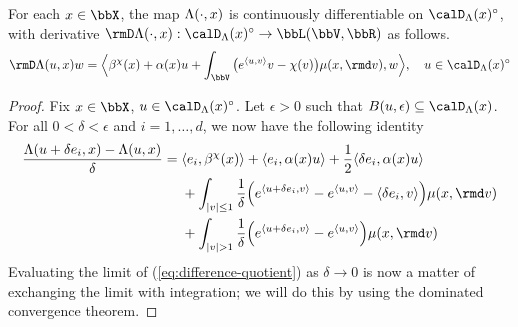 \begin{lemma}
  \label{lemma:ode-differentiable}
  For each $\stateVar \in \stateSpace$, the map $\Lambda(\cdot,x)$ is continuously differentiable on $\odeSpace(\stateVar)^\circ$, with derivative $\Der \ode(\cdot,\stateVar): \odeSpace(\stateVar)^\circ \rightarrow \bbL(\vecSpace, \bbR)$ as follows.
  \begin{equation}
    \label{eq:ode-derivative-truncation}
    \Der \ode(\momentVar,\stateVar) w = \Bprj{\affDrift^\trunc(\stateVar) + \affDiff(\stateVar)\momentVar + \int_\vecSpace \big( e^\prj{\momentVar}{\markVar} \markVar - \trunc(\markVar)\big) \affJump(\stateVar,\rmd\markVar)}{w}, \quad \momentVar \in \odeSpace(\stateVar)^\circ
  \end{equation}
\end{lemma}
\begin{proof}
  \label{proof:lemma:ode-differentiable}
  Fix $\stateVar \in \stateSpace$, $\momentVar \in \odeSpace(\stateVar)^\circ$.
  Let $\epsilon > 0$ such that $B(\momentVar, \epsilon) \subseteq \odeSpace(\stateVar)$.
  For all $0 < \delta < \epsilon$ and $i = 1, \ldots, d$, we now have the following identity
  \begin{equation}
    \label{eq:difference-quotient}
    \frac{\ode(\momentVar+\delta \basisVec_i,\stateVar) - \ode(\momentVar,\stateVar)}{\delta}
    = \begin{aligned}[t]
      &\prj{\basisVec_i}{\affDrift^\trunc(\stateVar)} + \prj{\basisVec_i}{\affDiff(\stateVar)\momentVar} + \frac12\prj{\delta \basisVec_i}{\affDiff(\stateVar)\momentVar} \\
      &+ \int_{|\markVar|\leq 1} \frac1\delta\Big( e^\prj{\momentVar+\delta \basisVec_i}{\markVar} - e^\prj{\momentVar}{\markVar} - \prj{\delta \basisVec_i}{\markVar} \Big) \affJump(\stateVar,\rmd\markVar) \\
      &+ \int_{|\markVar| > 1}  \frac1\delta\Big( e^\prj{\momentVar+\delta \basisVec_i}{\markVar} - e^\prj{\momentVar}{\markVar} \Big) \affJump(\stateVar,\rmd\markVar) \\
    \end{aligned}
  \end{equation}
  Evaluating the limit of (\ref{eq:difference-quotient}) as $\delta \rightarrow 0$ is now a matter of exchanging the limit with integration; we will do this by using the dominated convergence theorem.


\end{proof}
